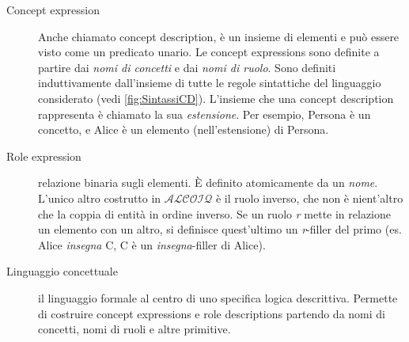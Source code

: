 \begin{description}
	\item[Concept expression] Anche chiamato concept description, è un insieme di elementi e può essere visto come un predicato unario. Le concept expressions sono definite a partire dai \textit{nomi di concetti} e dai \textit{nomi di ruolo}. Sono definiti induttivamente dall’insieme di tutte le regole sintattiche del linguaggio considerato (vedi \autoref{fig:SintassiCD}). L’insieme che una concept description rappresenta è chiamato la sua \textit{estensione}. Per esempio, Persona è un concetto, e Alice è un elemento (nell’estensione) di Persona.
	\item[Role expression] relazione binaria sugli elementi. È definito atomicamente da un \textit{nome}. L'unico altro costrutto in $\mathcal{ALCOIQ}$ è il ruolo inverso, che non è nient'altro che la coppia di entità in ordine inverso. Se un ruolo \textit{r} mette in relazione un elemento con un altro, si definisce quest’ultimo un \textit{r}-filler del primo (es. Alice \textit{insegna} C, C è un \textit{insegna}-filler di Alice).
	\item[Linguaggio concettuale] il linguaggio formale al centro di uno specifica logica descrittiva. Permette di costruire concept expressions e role descriptions partendo da nomi di concetti, nomi di ruoli e altre primitive.
\end{description}

